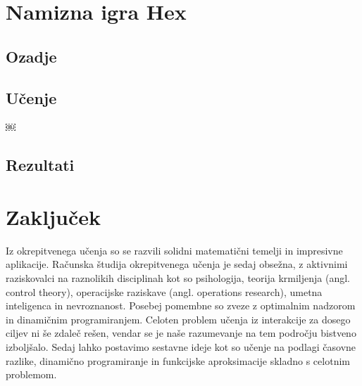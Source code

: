 \documentclass[a4paper, oneside, 12pt]{report}
\begin{document}


\chapter{Namizna igra Hex}
\thispagestyle{fancy}
\section{Ozadje}
\section{Učenje}
￼
\section{Rezultati}

\chapter{Zaključek}
\thispagestyle{fancy}
Iz okrepitvenega učenja so se razvili solidni matematični temelji in impresivne aplikacije. Računska študija okrepitvenega učenja je sedaj obsežna, z aktivnimi raziskovalci na raznolikih disciplinah kot so psihologija, teorija krmiljenja (angl. control theory), operacijske raziskave (angl. operations research), umetna inteligenca in nevroznanost. Posebej pomembne so zveze z optimalnim nadzorom in dinamičnim programiranjem. Celoten problem učenja iz interakcije za dosego ciljev ni še zdaleč rešen, vendar se je naše razumevanje na tem področju bistveno izboljšalo. Sedaj lahko postavimo sestavne ideje kot so učenje na podlagi časovne razlike, dinamično programiranje in funkcijske aproksimacije skladno s celotnim problemom.
\end{document}

